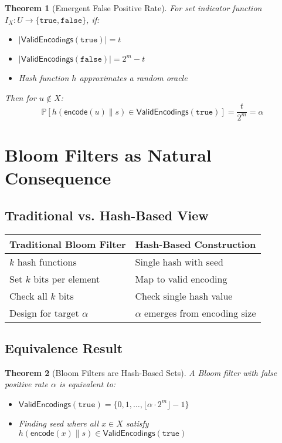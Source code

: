 \documentclass[11pt,final,hidelinks]{article}
\newtheorem{theorem}{Theorem}[section]
\newcommand{\Encode}[1]{\mathsf{encode}(#1)}
\newcommand{\ValidEnc}[1]{\mathsf{ValidEncodings}(#1)}
\newcommand{\Hash}[1]{h(#1)}
\newcommand{\Prob}[1]{\mathbb{P}[#1]}
\newcommand{\Card}[1]{|#1|}
\newcommand{\True}{\mathtt{true}}
\newcommand{\False}{\mathtt{false}}
\newcommand{\fprate}{\alpha}
\begin{document}
\begin{theorem}[Emergent False Positive Rate]
For set indicator function $I_X: U \to \{\True, \False\}$, if:
\begin{itemize}
    \item $\Card{\ValidEnc{\True}} = t$
    \item $\Card{\ValidEnc{\False}} = 2^m - t$
    \item Hash function $h$ approximates a random oracle
\end{itemize}
Then for $u \notin X$:
\begin{equation}
\Prob{\Hash{\Encode{u} \| s} \in \ValidEnc{\True}} = \frac{t}{2^m} = \fprate
\end{equation}
\end{theorem}

\section{Bloom Filters as Natural Consequence}

\subsection{Traditional vs. Hash-Based View}

\begin{center}
\begin{tabular}{ll}
\textbf{Traditional Bloom Filter} & \textbf{Hash-Based Construction} \\
\hline
$k$ hash functions & Single hash with seed \\
Set $k$ bits per element & Map to valid encoding \\
Check all $k$ bits & Check single hash value \\
Design for target $\fprate$ & $\fprate$ emerges from encoding size \\
\end{tabular}
\end{center}

\subsection{Equivalence Result}

\begin{theorem}[Bloom Filters are Hash-Based Sets]
A Bloom filter with false positive rate $\fprate$ is equivalent to:
\begin{itemize}
    \item $\ValidEnc{\True} = \{0, 1, \ldots, \lfloor\fprate \cdot 2^m\rfloor - 1\}$
    \item Finding seed where all $x \in X$ satisfy $\Hash{\Encode{x} \| s} \in \ValidEnc{\True}$
\end{itemize}
\end{theorem}
\end{document}
